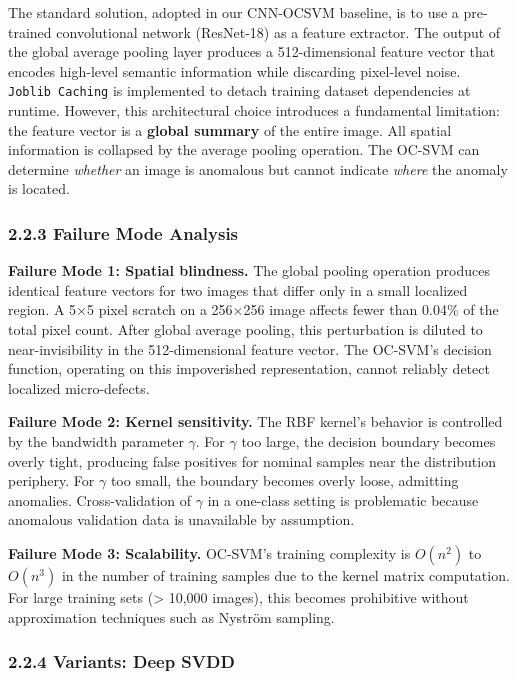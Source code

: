 \documentclass[12pt, a4paper, oneside]{report}
\begin{document}
The standard solution, adopted in our CNN-OCSVM baseline, is to use a pre-trained convolutional network (ResNet-18) as a feature extractor. The output of the global average pooling layer produces a 512-dimensional feature vector that encodes high-level semantic information while discarding pixel-level noise. \texttt{Joblib\ Caching} is implemented to detach training dataset dependencies at runtime. However, this architectural choice introduces a fundamental limitation: the feature vector is a \textbf{global summary} of the entire image. All spatial information is collapsed by the average pooling operation. The OC-SVM can determine \emph{whether} an image is anomalous but cannot indicate \emph{where} the anomaly is located.

\subsubsection{2.2.3 Failure Mode Analysis}\label{failure-mode-analysis-1}

\textbf{Failure Mode 1: Spatial blindness.} The global pooling operation produces identical feature vectors for two images that differ only in a small localized region. A 5$\times$5 pixel scratch on a 256$\times$256 image affects fewer than 0.04\% of the total pixel count. After global average pooling, this perturbation is diluted to near-invisibility in the 512-dimensional feature vector. The OC-SVM's decision function, operating on this impoverished representation, cannot reliably detect localized micro-defects.

\textbf{Failure Mode 2: Kernel sensitivity.} The RBF kernel's behavior is controlled by the bandwidth parameter \(\gamma\). For \(\gamma\) too large, the decision boundary becomes overly tight, producing false positives for nominal samples near the distribution periphery. For \(\gamma\) too small, the boundary becomes overly loose, admitting anomalies. Cross-validation of \(\gamma\) in a one-class setting is problematic because anomalous validation data is unavailable by assumption.

\textbf{Failure Mode 3: Scalability.} OC-SVM's training complexity is \(O(n^2)\) to \(O(n^3)\) in the number of training samples due to the kernel matrix computation. For large training sets (\textgreater{} 10,000 images), this becomes prohibitive without approximation techniques such as Nyström sampling.

\subsubsection{2.2.4 Variants: Deep SVDD}\label{variants-deep-svdd}
\end{document}
